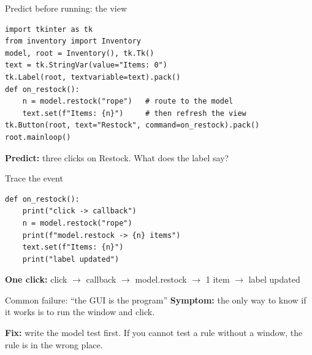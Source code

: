 \documentclass[aspectratio=169]{beamer}
\begin{document}
\begin{frame}[fragile]{Predict before running: the view}
\predictkicker
\begin{lstlisting}
import tkinter as tk
from inventory import Inventory
model, root = Inventory(), tk.Tk()
text = tk.StringVar(value="Items: 0")
tk.Label(root, textvariable=text).pack()
def on_restock():
    n = model.restock("rope")   # route to the model
    text.set(f"Items: {n}")     # then refresh the view
tk.Button(root, text="Restock", command=on_restock).pack()
root.mainloop()
\end{lstlisting}
  \textbf{Predict:} three clicks on Restock. What does the label say?
\end{frame}

\begin{frame}[fragile]{Trace the event}
\codeframekicker
\begin{lstlisting}
def on_restock():
    print("click -> callback")
    n = model.restock("rope")
    print(f"model.restock -> {n} items")
    text.set(f"Items: {n}")
    print("label updated")
\end{lstlisting}
  \textbf{One click:} click $\rightarrow$ callback $\rightarrow$ model.restock $\rightarrow$ 1 item $\rightarrow$ label updated
\end{frame}

\begin{misconceptionframe}{Common failure: ``the GUI is the program''}
  \textbf{Symptom:} the only way to know if it works is to run the window and click.

  \vspace{2mm}
  \textbf{Fix:} write the model test first. If you cannot test a rule without a window, the rule is in the wrong place.
\end{misconceptionframe}
\end{document}
